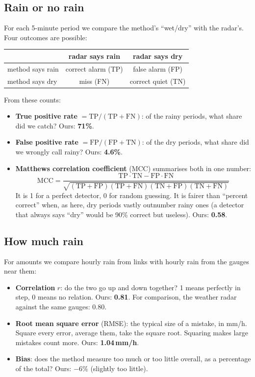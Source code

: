 \documentclass[11pt,a4paper]{article}
\begin{document}
\subsection{Rain or no rain}
For each 5-minute period we compare the method's ``wet/dry'' with the radar's. Four outcomes are possible:
\begin{center}\small
\begin{tabular}{lcc}
\toprule
& radar says rain & radar says dry \\
\midrule
method says rain & correct alarm (TP) & false alarm (FP) \\
method says dry & miss (FN) & correct quiet (TN) \\
\bottomrule
\end{tabular}
\end{center}
From these counts:
\begin{itemize}
\item \textbf{True positive rate} $=\text{TP}/(\text{TP}+\text{FN})$: of the rainy periods, what share did we catch? Ours: \textbf{71\%}.
\item \textbf{False positive rate} $=\text{FP}/(\text{FP}+\text{TN})$: of the dry periods, what share did we wrongly call rainy? Ours: \textbf{4.6\%}.
\item \textbf{Matthews correlation coefficient} (MCC) summarises both in one number:
\[
\text{MCC} = \frac{\text{TP}\cdot\text{TN} - \text{FP}\cdot\text{FN}}
{\sqrt{(\text{TP}+\text{FP})(\text{TP}+\text{FN})(\text{TN}+\text{FP})(\text{TN}+\text{FN})}}
\]
It is 1 for a perfect detector, 0 for random guessing. It is fairer than ``percent correct'' when, as here,
dry periods vastly outnumber rainy ones (a detector that always says ``dry'' would be 90\% correct but useless).
Ours: \textbf{0.58}.
\end{itemize}

\subsection{How much rain}
For amounts we compare hourly rain from links with hourly rain from the gauges near them:
\begin{itemize}
\item \textbf{Correlation} $r$: do the two go up and down together? 1 means perfectly in step, 0 means no relation.
Ours: \textbf{0.81}. For comparison, the weather radar against the same gauges: 0.80.
\item \textbf{Root mean square error} (RMSE): the typical size of a mistake, in mm/h. Square every error, average them,
take the square root. Squaring makes large mistakes count more. Ours: \textbf{1.04\,mm/h}.
\item \textbf{Bias}: does the method measure too much or too little overall, as a percentage of the total? Ours: \textbf{$-6\%$}
(slightly too little).
\end{itemize}
\end{document}
